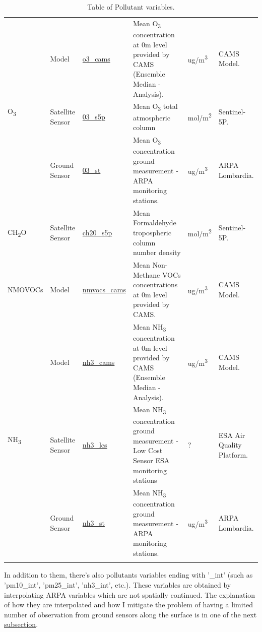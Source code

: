 \begin{center}
\begin{longtable}{ |p{2cm}|p{1.5cm}|p{2.3cm}|p{4cm}|p{1cm}|p{2cm}| }
\multirow{3}{4em}{O\textsubscript{3}} & Model  & \underline{o3\_cams} & Mean O\textsubscript{3} concentration at 0m level provided by CAMS  (Ensemble Median - Analysis). & ug/m\textsuperscript{3} & CAMS Model.\\ 
& Satellite \newline Sensor  & \underline{03\_s5p} &  Mean O\textsubscript{3} total atmospheric column  & mol/m\textsuperscript{2} & Sentinel-5P.\\ 
& Ground \newline Sensor & \underline{03\_st} &  Mean O\textsubscript{3} concentration ground measurement - ARPA monitoring stations.  & ug/m\textsuperscript{3} & ARPA \newline Lombardia.\\ 
 \hline
 
 \multirow{1}{4em}{CH\textsubscript{2}O}& Satellite \newline Sensor  & \underline{ch20\_s5p} &  Mean Formaldehyde tropospheric column number density & mol/m\textsuperscript{2} & Sentinel-5P.\\ \hline
 
\multirow{1}{4em}{NMOVOCs}& Model  & \underline{nmvocs\_cams} & Mean Non-Methane VOCs concentrations at 0m level provided by CAMS. & ug/m\textsuperscript{3} & CAMS Model.\\ \hline

\multirow{3}{4em}{NH\textsubscript{3}} & Model  & \underline{nh3\_cams} & Mean NH\textsubscript{3} concentration at 0m level provided by CAMS  (Ensemble Median - Analysis). & ug/m\textsuperscript{3} & CAMS Model.\\ 
& Satellite \newline Sensor  & \underline{nh3\_lcs} &  Mean NH\textsubscript{3} concentration ground measurement - Low Cost Sensor ESA monitoring stations  & ? & ESA Air Quality Platform.\\ 
& Ground \newline Sensor & \underline{nh3\_st} &  Mean NH\textsubscript{3} concentration ground measurement - ARPA monitoring stations.  & ug/m\textsuperscript{3} & ARPA \newline Lombardia.\\ \hline
\caption{Table of Pollutant variables.}
\end{longtable}
\end{center}
In addition to them, there's also pollutants variables ending with '\_int' (such as 'pm10\_int', 'pm25\_int', 'nh3\_int', etc.). These variables are obtained by interpolating ARPA variables which are not spatially continued. The explanation of how they are interpolated and how I mitigate the problem of having a limited number of observation from ground sensors along the surface is in one of the next \hyperref[subsec:nan]{subsection}.
